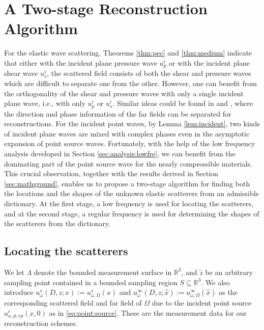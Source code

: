 \documentclass[a4paper,11pt]{article}
\theoremstyle{remark}
\theoremstyle{definition}
\numberwithin{equation}{section}
\begin{document}
\section{A Two-stage Reconstruction Algorithm}\label{sec:two-stage}
For the elastic wave scattering, Theorems \ref{thm:pec} and \ref{thm:medium} indicate that either with the incident plane pressure wave $u_{p}^i$ or with the incident plane shear wave $u_{s}^i$, the scattered field consists of both the shear and pressure waves which are difficult to separate one from the other. However, one can benefit from the orthogonality of the shear and pressure waves with only a single incident plane wave, i.e., with only $u_{p}^i$ or $u_{s}^i$. Similar ideas could be found in \cite{HLLS} and \cite{Sini}, where the direction and phase information of the far fields can be separated for reconstructions.
 For the incident point waves, by Lemma \ref{lem:incident}, two kinds of incident plane waves are mixed with complex phases even in the asymptotic expansion of point source waves. Fortunately, with the help of the low frequency analysis developed in Section \ref{sec:analysis:lowfre}, we can benefit from the dominating part of the point source wave for the nearly compressible materials.
This crucial observation, together with the results derived in Section \ref{sec:mathground}, enables us to propose a two-stage algorithm for finding both the locations and the shapes of the unknown elastic scatterers from an admissible dictionary. At the first stage, a low frequency is used for locating the scatterers, and at the second stage, a regular frequency is used for determining the shapes of the scatterers from the dictionary.



\subsection{Locating the scatterers}\label{subsect:locating}

We let $\Lambda$ denote the bounded measurement surface in $\mathbb{R}^3$, and $\tilde{z}$ be an arbitrary sampling point contained in a bounded sampling region $S \subseteq \mathbb{R}^3$. We also introduce $u_{\omega}^{s}(D,z;x):=u_{\omega,\Omega}^{s}(x)$ and $u_{\omega}^{\infty}(D,z;\hat{x}):=u_{\omega,\Omega}^{\infty}(\hat{x})$ as
the corresponding scattered field and far field of $\Omega$ due to the incident point source $u_{\omega, p, ep}^i(x,0)$ as in \eqref{eq:point:source}. These are the measurement data for our reconstruction schemes.
\end{document}
